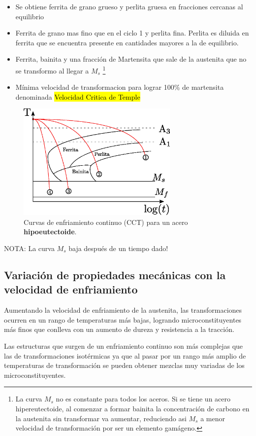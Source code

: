 \begin{itemize}
    \item[Ciclo 1] Se obtiene ferrita de grano grueso y perlita gruesa en fracciones cercanas al equilibrio
    \item[Ciclo 2] Ferrita de grano mas fino que en el ciclo 1 y perlita fina. Perlita es diluida en ferrita que se encuentra presente en cantidades mayores a la de equilibrio. 
    \item[Ciclo 3] Ferrita, bainita y una fracción de Martensita que sale de la austenita que no se transformo al llegar a $M_s$ \footnote{La curva $M_s$ no es constante para todos los aceros. Si se tiene un acero hipereutectoide, al comenzar a formar bainita la concentración de carbono en la austenita sin transformar va aumentar, reduciendo asi $M_s$ a menor velocidad de transformación por ser un elemento gamágeno.}
    \item[Ciclo 4] Mínima velocidad de transformacion para lograr 100\% de martensita denominada \hl{Velocidad Critica de Temple}
\end{itemize}

\begin{figure}[htb!]
    \centering
    \includegraphics[width=0.7\textwidth]{fig/CCThipo.eps}
    \caption{Curvas de enfriamiento continuo (CCT) para un acero \textbf{hipoeutectoide}.}
    \label{fig:CCThipo}
\end{figure}

NOTA: La curva $M_s$ baja después de un tiempo dado!


\subsection{Variación de propiedades mecánicas con la velocidad de enfriamiento}
Aumentando la velocidad de enfriamiento de la austenita, las transformaciones ocurren en un rango de temperaturas más bajas, logrando microconstituyentes más finos que conlleva con un aumento de dureza y resistencia a la tracción. 

Las estructuras que surgen de un enfriamiento continuo son más complejas que las de transformaciones isotérmicas ya que al pasar por un rango más amplio de temperaturas de transformación se pueden obtener mezclas muy variadas de los microconstituyentes.